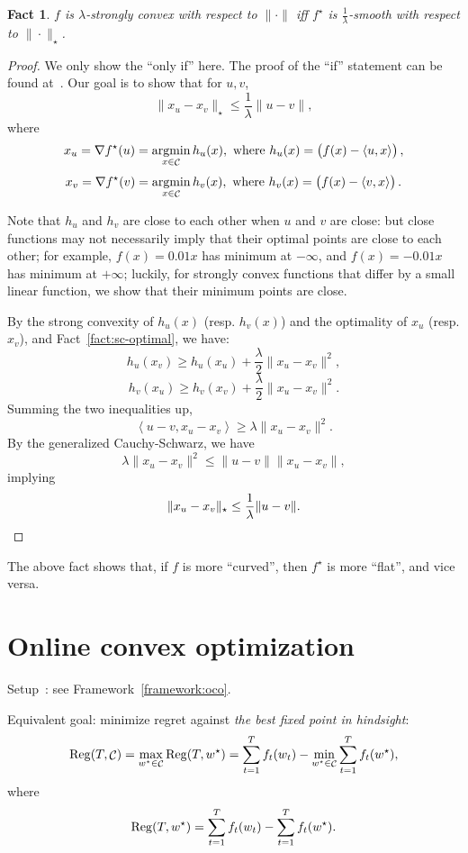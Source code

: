 \documentclass{article}
\newtheorem{fact}{Fact}
\DeclareMathOperator*{\Reg}{{\rm Reg}}
\DeclareMathOperator*{\Ccal}{{\cal C}}
\DeclareMathOperator*{\argmin}{{\rm argmin}}
\newcommand{\inner}[2]{\left\langle #1,#2 \right\rangle}
\begin{document}
\begin{fact}
$f$ is $\lambda$-strongly convex with respect to $\| \cdot \|$ iff $f^\star$ is $\frac1\lambda$-smooth with respect to $\| \cdot \|_\star$.
\label{fact:sc-sm}
\end{fact}
\begin{proof}
We only show the ``only if'' here. The proof of the ``if'' statement can be found at~\cite[][Theorem 3]{kakade2012regularization}.
Our goal is to show that for $u, v$,
\[ \| x_u - x_v \|_\star \leq \frac1\lambda \| u - v\|, \]
where
\[ x_u = \nabla f^\star(u) = \argmin_{x \in \Ccal} h_u(x), \text{ where } h_u(x) = \del{f(x) - \inner{u}{x}} , \]
\[ x_v = \nabla f^\star(v) = \argmin_{x \in \Ccal} h_v(x), \text{ where } h_v(x) = \del{f(x) - \inner{v}{x}} . \]

Note that $h_u$ and $h_v$ are close to each other when $u$ and $v$ are close: but close functions may not necessarily imply that their optimal points are close to each other; for example, $f(x) = 0.01x$ has minimum at $-\infty$, and
$f(x) = -0.01x$ has minimum at $+\infty$; luckily, for strongly convex functions that differ by a small linear function, we show that their minimum points are close.

By the strong convexity of $h_u(x)$ (resp. $h_v(x)$) and the optimality of $x_u$ (resp. $x_v$), and Fact~\ref{fact:sc-optimal}, we have:
\[ h_u(x_v) \geq h_u(x_u) + \frac{\lambda}{2} \| x_u - x_v \|^2, \]
\[ h_v(x_u) \geq h_v(x_v) + \frac{\lambda}{2} \| x_u - x_v \|^2. \]
Summing the two inequalities up,
\[ \inner{u - v}{x_u - x_v} \geq \lambda \| x_u - x_v \|^2. \]
By the generalized Cauchy-Schwarz, we have
\[ \lambda \| x_u - x_v \|^2 \leq \| u -v \| \| x_u - x_v \|, \]
implying
\[ \| x_u - x_v \|_\star \leq \frac1\lambda \| u - v \|. \qedhere\]
\end{proof}

The above fact shows that, if $f$ is more ``curved'', then $f^\star$ is more ``flat'', and vice versa.

\section{Online convex optimization}

Setup~\cite{gordon1999regret, zinkevich2003online}: see Framework~\ref{framework:oco}.

Equivalent goal: minimize regret against {\em the best fixed point in hindsight}:
\[
\Reg(T, \Ccal) = \max_{w^\star \in \Ccal} \Reg(T, w^\star) = \sum_{t=1}^T f_t(w_t) - \min_{w^\star \in \Ccal} \sum_{t=1}^T f_t(w^\star),
\]
where
\[
\Reg(T, w^\star) = \sum_{t=1}^T f_t(w_t) - \sum_{t=1}^T f_t(w^\star).
\]
\end{document}
